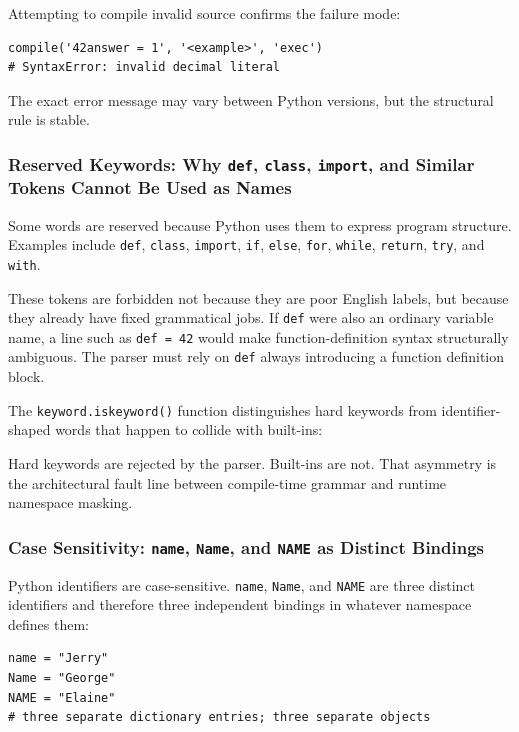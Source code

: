 Attempting to compile invalid source confirms the failure mode:

\begin{verbatim}
compile('42answer = 1', '<example>', 'exec')
# SyntaxError: invalid decimal literal
\end{verbatim}

The exact error message may vary between Python versions, but the structural rule is stable.

\subsubsection{Reserved Keywords: Why \texttt{def}, \texttt{class}, \texttt{import}, and Similar Tokens Cannot Be Used as Names}

Some words are reserved because Python uses them to express program structure. Examples include \texttt{def}, \texttt{class}, \texttt{import}, \texttt{if}, \texttt{else}, \texttt{for}, \texttt{while}, \texttt{return}, \texttt{try}, and \texttt{with}.

These tokens are forbidden not because they are poor English labels, but because they already have fixed grammatical jobs. If \texttt{def} were also an ordinary variable name, a line such as \texttt{def = 42} would make function-definition syntax structurally ambiguous. The parser must rely on \texttt{def} always introducing a function definition block.

The \texttt{keyword.iskeyword()} function distinguishes hard keywords from identifier-shaped words that happen to collide with built-ins:

Hard keywords are rejected by the parser. Built-ins are not. That asymmetry is the architectural fault line between compile-time grammar and runtime namespace masking.

\subsubsection{Case Sensitivity: \texttt{name}, \texttt{Name}, and \texttt{NAME} as Distinct Bindings}

Python identifiers are case-sensitive. \texttt{name}, \texttt{Name}, and \texttt{NAME} are three distinct identifiers and therefore three independent bindings in whatever namespace defines them:

\begin{verbatim}
name = "Jerry"
Name = "George"
NAME = "Elaine"
# three separate dictionary entries; three separate objects
\end{verbatim}

